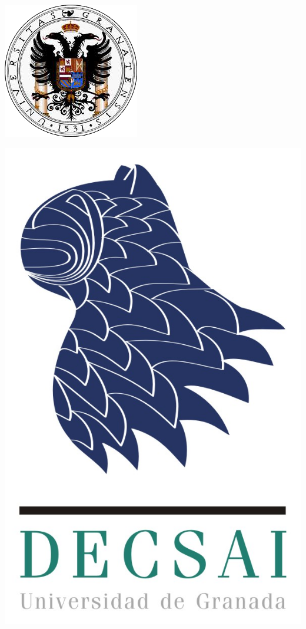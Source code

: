 \documentclass[12zpt]{article}
\begin{document}
\begin{center}																		%
\newcommand{\HRule}{\rule{\linewidth}{0.5mm}}									%
\begin{minipage}{0.48\textwidth} \begin{flushleft}
\includegraphics[scale = 0.42]{logo1.png}
\end{flushleft}\end{minipage}
\begin{minipage}{0.48\textwidth} \begin{flushright}
\includegraphics[scale = 0.55]{logo2.jpg}
\end{flushright}\end{minipage}


\end{center}
\end{document}
